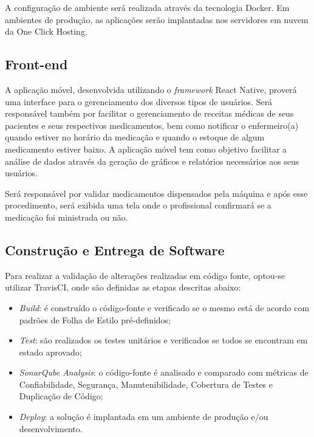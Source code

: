A configuração de ambiente será realizada através da tecnologia Docker. Em ambientes de produção, as aplicações serão implantadas nos servidores em nuvem da One Click Hosting.

\subsection{Front-end}
A aplicação móvel, desenvolvida utilizando o \emph{framework} React Native, proverá uma interface para o gerenciamento dos diversos tipos de usuários. Será responsável também por facilitar o gerenciamento de receitas médicas de seus pacientes e seus respectivos medicamentos, bem como notificar o enfermeiro(a) quando estiver no horário da medicação e quando o estoque de algum medicamento estiver baixo. A aplicação móvel tem como objetivo facilitar a análise de dados através da geração de gráficos e relatórios necessários aos seus usuários. 

Será responsável por validar medicamentos dispensados pela máquina e após esse procedimento, será exibida uma tela onde o profissional confirmará se a medicação foi ministrada ou não.

\subsection{Construção e Entrega de Software}
Para realizar a validação de alterações realizadas em código fonte, optou-se utilizar TravisCI, onde são definidas as etapas descritas abaixo:

\begin{itemize}
    \item \emph{Build}: é construído o código-fonte e verificado se o mesmo está de acordo com padrões de Folha de Estilo pré-definidos;
    \item  \emph{Test}: são realizados os testes unitários e verificados se todos se encontram em estado aprovado;
    \item  \emph{SonarQube Analysis}: o código-fonte é analisado e comparado com métricas de Confiabilidade, Segurança, Manutenibilidade, Cobertura de Testes e Duplicação de Código;
    \item  \emph{Deploy}: a solução é implantada em um ambiente de produção e/ou desenvolvimento. 
\end{itemize}

